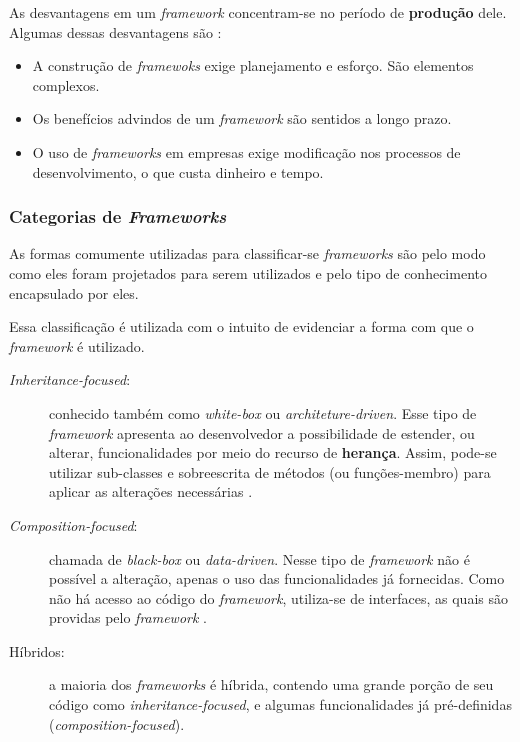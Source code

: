As desvantagens em um \textit{framework} concentram-se no período de \textbf{produção} dele. Algumas dessas desvantagens são \cite{barretoJunior2006} \cite{sauve2006}:
\begin{itemize}
\item A construção de \textit{framewoks} exige planejamento e esforço. São elementos complexos.
\item Os benefícios advindos de um \textit{framework} são sentidos a longo prazo.
\item O uso de \textit{frameworks} em empresas exige modificação nos processos de desenvolvimento, o que custa dinheiro e tempo.
\end{itemize}
\par

\subsubsection{Categorias de \textit{Frameworks}}
As formas comumente utilizadas para classificar-se \textit{frameworks} são pelo modo como eles foram projetados para serem utilizados e pelo tipo de conhecimento encapsulado por eles.

Essa classificação é utilizada com o intuito de evidenciar a forma com que o \textit{framework} é utilizado.
\begin{description}
\item[\textit{Inheritance-focused}:] conhecido também como \textit{white-box} ou \textit{architeture-driven}. Esse tipo de \textit{framework} apresenta ao desenvolvedor a possibilidade de estender, ou alterar, funcionalidades por meio do recurso de \textbf{herança}. Assim, pode-se utilizar sub-classes e sobreescrita de métodos (ou funções-membro) para aplicar as alterações necessárias \cite{sauve2006}.
\item[\textit{Composition-focused}:] chamada de \textit{black-box} ou \textit{data-driven}. Nesse tipo de \textit{framework}  não é possível a alteração, apenas o uso das funcionalidades já fornecidas. Como não há acesso ao código do \textit{framework}, utiliza-se de interfaces, as quais são providas pelo \textit{framework} \cite{sauve2006}.
\item[Híbridos:] a maioria dos \textit{frameworks} é híbrida, contendo uma grande porção de seu código como \textit{inheritance-focused}, e algumas funcionalidades já pré-definidas (\textit{composition-focused}).
\end{description}

